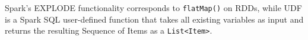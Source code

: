Spark’s EXPLODE functionality corresponds to \texttt{flatMap()} on RDDs, while UDF is a Spark SQL user-defined function that takes all existing variables as input and returns the resulting Sequence of Items as a \texttt{List<Item>}.

